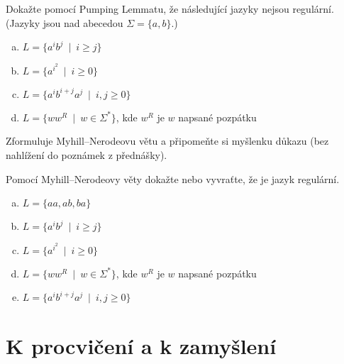 \documentclass[a4paper,12pt]{amsart}
\begin{document}
\medskip\begin{problem}

    Dokažte pomocí Pumping Lemmatu, že následující jazyky nejsou regulární. (Jazyky jsou nad abecedou $\Sigma=\{a,b\}$.)

    \medskip
      
    \begin{enumerate}[(a)]\setlength\itemsep{6pt}        
        \item $L=\{a^ib^j\ \mid\ i\geq j\}$       
        \item $L=\{a^{i^2}\ \mid\ i\geq 0\}$        
        \item $L=\{a^ib^{i+j}a^j\ \mid\ i,j\geq 0\}$
        \item $L=\{ww^R\ \mid \ w\in\Sigma^*\}$, kde $w^R$ je  $w$ napsané pozpátku
    \end{enumerate}
  
\end{problem}


\medskip\begin{problem}
    
    Zformuluje Myhill--Nerodeovu větu a připomeňte si myšlenku důkazu (bez nahlížení do poznámek z přednášky).

\end{problem}


\medskip\begin{problem}

    Pomocí Myhill--Nerodeovy věty dokažte nebo vyvraťte, že je jazyk regulární.

    \begin{enumerate}[(a)]\setlength\itemsep{6pt}
        \item $L=\{aa, ab, ba\}$        
        \item $L=\{a^ib^j\ \mid\ i\geq j\}$        
        \item $L=\{a^{i^2}\ \mid\ i\geq 0\}$ 
        \item $L=\{ww^R\ \mid \ w\in\Sigma^*\}$, kde $w^R$ je  $w$ napsané pozpátku
        \item $L=\{a^ib^{i+j}a^j\ \mid\ i,j\geq 0\}$        
    \end{enumerate}

\end{problem}


\section*{K procvičení a k zamyšlení}
\end{document}
